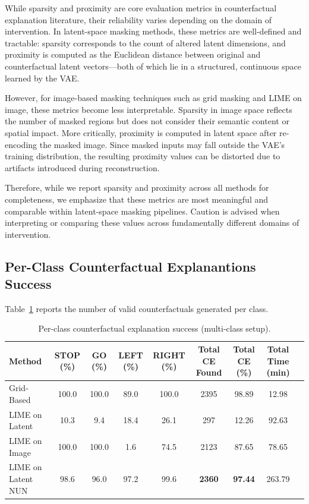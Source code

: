 \vspace{0.8em}

While sparsity and proximity are core evaluation metrics in counterfactual explanation literature, their reliability varies depending on the domain of intervention. In latent-space masking methods, these metrics are well-defined and tractable: sparsity corresponds to the count of altered latent dimensions, and proximity is computed as the Euclidean distance between original and counterfactual latent vectors—both of which lie in a structured, continuous space learned by the VAE.

However, for image-based masking techniques such as grid masking and LIME on image, these metrics become less interpretable. Sparsity in image space reflects the number of masked regions but does not consider their semantic content or spatial impact. More critically, proximity is computed in latent space after re-encoding the masked image. Since masked inputs may fall outside the VAE's training distribution, the resulting proximity values can be distorted due to artifacts introduced during reconstruction.

Therefore, while we report sparsity and proximity across all methods for completeness, we emphasize that these metrics are most meaningful and comparable within latent-space masking pipelines. Caution is advised when interpreting or comparing these values across fundamentally different domains of intervention.




\subsection{Per-Class Counterfactual Explanantions Success}
Table~\ref{tab:classwise_ce_multi} reports the number of valid counterfactuals generated per class.

\begin{table}[htbp]
\centering
\scriptsize
\begin{tabular}{lcccccccc}
\toprule
\textbf{Method} & \textbf{STOP (\%)} & \textbf{GO (\%)} & \textbf{LEFT (\%)} & \textbf{RIGHT (\%)} & \textbf{Total CE Found} & \textbf{Total CE (\%)} & \textbf{Total Time (min)} \\
\midrule
Grid-Based        & 100.0 & 100.0 & 89.0  & 100.0 & 2395 & 98.89 & 12.98 \\
LIME on Latent    & 10.3  & 9.4   & 18.4  & 26.1  & 297  & 12.26 & 92.63 \\
LIME on Image     & 100.0 & 100.0 & 1.6   & 74.5  & 2123 & 87.65 & 78.65 \\
LIME on Latent NUN & 98.6  & 96.0  & 97.2  & 99.6  & \textbf{2360} & \textbf{97.44} & 263.79 \\
\bottomrule
\end{tabular}
\caption{Per-class counterfactual explanation success (multi-class setup).}
\label{tab:classwise_ce_multi}
\end{table}

